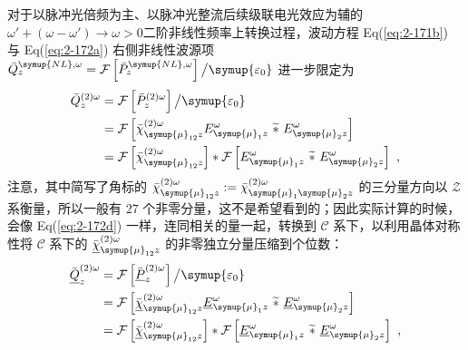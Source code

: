 对于以脉冲光倍频为主、以脉冲光整流后续级联电光效应\cite{jangMulticycleTerahertzPulse2020}为辅的 $\omega' + \left( \omega-\omega' \right) \to \omega > 0$二阶非线性频率上转换过程，波动方程 Eq(\ref{eq:2-171b}) 与 Eq(\ref{eq:2-172a}) 右侧非线性波源项 $\bar{Q}^{{\symup{NL}},\omega}_{z} = \mathcal F \left[ \bar{P}^{{\symup{NL}},\omega}_z \right] \big/ {\symup{\varepsilon_0}}$ 进一步限定为
\begin{subequations} \label{eq:2-173}
	\abovedisplayskip=10pt
	\belowdisplayskip=10pt
	\begin{align}
		\bar{Q}^{(2)\omega}_{z} &= \mathcal F \left[ \bar{P}^{(2)\omega}_z \right] \big/ {\symup{\varepsilon_0}} \label{eq:2-173a} \\ &= \mathcal F \left[ \bar{\chi}^{(2)\omega}_{ {\symup{\mu}}_{12}z} E^\omega_{{\symup{\mu}}_1 z}\ \widetilde *\ E^\omega_{{\symup{\mu}}_2 z} \right] \label{eq:2-173b} \\ &= \mathcal F \left[ \bar{\chi}^{(2)\omega}_{ {\symup{\mu}}_{12}z} \right] * \mathcal F \left[ E^\omega_{{\symup{\mu}}_1 z}\ \widetilde *\ E^\omega_{{\symup{\mu}}_2 z} \right] \label{eq:2-173c}~,
	\end{align}
\end{subequations}
注意，其中简写了角标的 $\bar{\chi}^{(2)\omega}_{ {\symup{\mu}}_{12} z} := \bar{\chi}^{(2)\omega}_{ {\symup{\mu}}_1 {\symup{\mu}}_2z}$ 的三分量方向以 $\mathcal{Z}$ 系衡量，所以一般有 $27$ 个非零分量，这不是希望看到的；因此实际计算的时候，会像 Eq(\ref{eq:2-172d}) 一样，连同相关的量一起，转换到 $\mathcal{C}$ 系下，以利用晶体对称性将 $\mathcal{C}$ 系下的 $\bar{\underline{\chi}}^{(2)\omega}_{ {\symup{\mu}}_{12}z}$ 的非零独立分量压缩到个位数：
\begin{subequations} \label{eq:2-174}
	\abovedisplayskip=10pt
	\belowdisplayskip=10pt
	\begin{align}
		\bar{\underline{Q}}^{(2)\omega}_{z} &= \mathcal F \left[ \bar{\underline{P}}^{(2)\omega}_z \right] \big/ {\symup{\varepsilon_0}} \label{eq:2-174a} \\ &= \mathcal F \left[ \bar{\underline{\chi}}^{(2)\omega}_{ {\symup{\mu}}_{12}z} \underline{E}^\omega_{{\symup{\mu}}_1 z}\ \widetilde *\ \underline{E}^\omega_{{\symup{\mu}}_2 z} \right] \label{eq:2-174b} \\ &= \mathcal F \left[ \bar{\underline{\chi}}^{(2)\omega}_{ {\symup{\mu}}_{12}z} \right] * \mathcal F \left[ \underline{E}^\omega_{{\symup{\mu}}_1 z}\ \widetilde *\ \underline{E}^\omega_{{\symup{\mu}}_2 z} \right] \label{eq:2-174c}~,
	\end{align}
\end{subequations}
